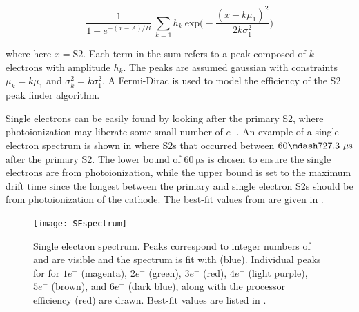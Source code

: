 \begin{equation}
\frac{1}{1 + e^{-(x - A) / B}}\ \sum_{k = 1} h_k\ \mathrm{exp} \bigg( -\frac{(x - k \mu_1)^2}{2 k \sigma_1^2} \bigg)
\label{eq:det_char_single_electron_gain_model}
\end{equation}

\noindent where here $x = \mathrm{S2}$.  Each term in the sum refers to a peak composed of $k$ electrons with amplitude $h_k$.  The
peaks are assumed gaussian with constraints $\mu_k = k \mu_1$ and $\sigma_k^2 = k \sigma_1^2$.  A Fermi-Dirac is used to model the
efficiency of the S2 peak finder algorithm.

Single electrons can be easily found by looking after the primary S2, where photoionization may liberate some small number of $e^-$.  An
example of a single electron spectrum is shown in  where S2s that occurred
between $60 \mdash 727.3\ \mathrm{\mu s}$ after the primary S2.  The lower bound of $60\ \mathrm{\mu s}$ is chosen to
ensure the single electrons are from photoionization, while the upper bound is set to the maximum drift time since the longest
between the primary and single electron S2s should be from photoionization of the cathode.  The best-fit values from
 are given in .

\begin{figure}
\centering
\texttt{[image: SEspectrum]}
\caption[Single electron spectrum.  Peaks correspond to integer numbers of \electron and are visible and the spectrum is fit
with .]{Single electron spectrum.  Peaks correspond to integer numbers of \electron and are visible and the spectrum is fit
with  (blue).  Individual peaks for for $1 e^-$ (magenta), $2 e^-$ (green), $3 e^-$ (red),
$4 e^-$ (light purple), $5 e^-$ (brown), and $6 e^-$ (dark blue), along with the processor efficiency (red) are drawn.  Best-fit values
are listed in .}
\label{fig:calibrations_single_electron_gain_num_photons}
\end{figure}

